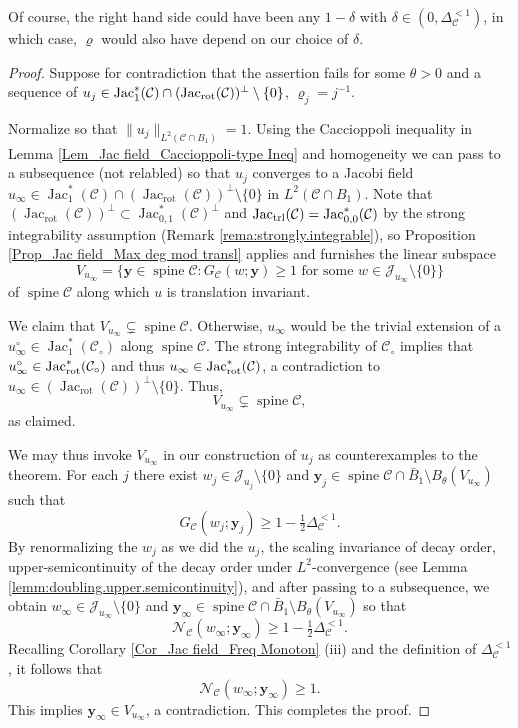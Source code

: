 \documentclass[11pt, letterpaper, reqno]{amsart}
\numberwithin{equation}{section}
\theoremstyle{remark}
\newcommand{\cC}{\mathcal{C}}
\newcommand{\cJ}{\mathcal{J}}
\newcommand{\cN}{\mathcal{N}}
\newcommand{\mbfy}{\mathbf{y}}
\newcommand{\Jac}{\operatorname{Jac}}
\newcommand{\spine}{\operatorname{spine}}
\begin{document}
    Of course, the right hand side could have been any $1-\delta$ with $\delta \in (0, \Delta_\cC^{<1})$, in which case, $\varrho$ would also have depend on our choice of $\delta$.
    
    \begin{proof}
      Suppose for contradiction that the assertion fails for some $\theta>0$ and a sequence of $u_j\in \Jac^*_1(\cC)\cap (\Jac_\textnormal{rot}(\cC))^\perp \setminus \{0\}$, $\varrho_j = j^{-1}$. 
      
      Normalize so that $\|u_j\|_{L^2(\cC \cap B_1)}=1$. Using the Caccioppoli inequality in Lemma \ref{Lem_Jac field_Caccioppoli-type Ineq} and homogeneity we can pass to a subsequence (not relabled) so that $u_j$ converges to a Jacobi field $u_\infty\in \Jac_1^*(\cC)\cap (\Jac_\textrm{rot}(\cC))^\perp \setminus \{ 0 \}$ in $L^2(\cC \cap B_1)$. Note that $(\Jac_\textrm{rot}(\cC))^\perp\subset \Jac^*_{0,1}(\cC)^{\perp}$ and $\Jac_\textnormal{trl}(\cC) = \Jac^*_{0,0}(\cC)$ by the strong integrability assumption (Remark \ref{rema:strongly.integrable}), so Proposition \ref{Prop_Jac field_Max deg mod transl} applies and furnishes the linear subspace 
      \[ V_{u_\infty} = \{ \mbfy \in \spine \cC : G_\cC(w; \mbfy) \geq 1 \text{ for some } w \in \cJ_{u_\infty} \setminus \{0\} \} \]
      of $\spine \cC$ along which $u$ is translation invariant.
      
      We claim that $V_{u_\infty} \subsetneq \spine \cC$. Otherwise, $u_\infty$ would be the trivial extension of a $u_\infty^\circ \in \Jac^*_1(\cC_\circ)$ along $\spine \cC$. The strong integrability of $\cC_\circ$ implies that $u_\infty^\circ \in \Jac^*_\textnormal{rot}(\cC_\circ)$ and thus $u_\infty \in \Jac^*_\textnormal{rot}(\cC)$, a contradiction to $u_\infty \in (\Jac_\textrm{rot}(\cC))^\perp \setminus \{ 0 \}$. Thus,
      \[ V_{u_\infty} \subsetneq \spine \cC, \]
      as claimed.
      
      We may thus invoke $V_{u_\infty}$ in our construction of $u_j$ as counterexamples to the theorem. For each $j$ there exist $w_j \in \cJ_{u_j} \setminus \{ 0 \}$ and $\mbfy_j \in \spine \cC \cap \bar B_1 \setminus B_\theta(V_{u_\infty})$ such that
      \[ G_\cC(w_j; \mbfy_j) \geq 1 - \tfrac12 \Delta_\cC^{<1}. \]
	By renormalizing the $w_j$ as we did the $u_j$, the scaling invariance of decay order, upper-semicontinuity of the decay order under $L^2$-convergence (see Lemma \ref{lemm:doubling.upper.semicontinuity}), and after passing to a subsequence, we obtain $w_\infty \in \cJ_{u_\infty} \setminus \{ 0 \}$ and $\mbfy_\infty \in \spine \cC \cap \bar B_1 \setminus B_\theta(V_{u_\infty})$ so that
	\[ \cN_\cC(w_\infty; \mbfy_\infty) \geq 1 - \tfrac12 \Delta_\cC^{<1}. \]
      Recalling Corollary \ref{Cor_Jac field_Freq Monoton} (iii) and the definition of $\Delta_\cC^{<1}$, it follows that
      \[ \cN_\cC(w_\infty; \mbfy_\infty) \geq 1. \]
      This implies $\mbfy_\infty \in V_{u_\infty}$, a contradiction. This completes the proof.
\end{proof}
\end{document}
